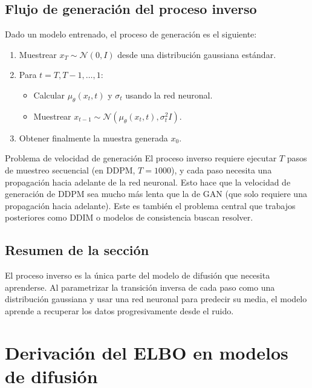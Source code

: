 \documentclass[a4paper]{article}
\begin{document}
\subsection{Flujo de generación del proceso inverso}

Dado un modelo entrenado, el proceso de generación es el siguiente:

\begin{enumerate}
    \item Muestrear $x_T \sim \mathcal{N}(0, I)$ desde una distribución gaussiana estándar.
    \item Para $t = T, T-1, \ldots, 1$:
    \begin{itemize}
        \item Calcular $\mu_\theta(x_t, t)$ y $\sigma_t$ usando la red neuronal.
        \item Muestrear $x_{t-1} \sim \mathcal{N}(\mu_\theta(x_t, t), \sigma_t^2 I)$.
    \end{itemize}
    \item Obtener finalmente la muestra generada $x_0$.
\end{enumerate}

\begin{warningbox}{Problema de velocidad de generación}
El proceso inverso requiere ejecutar $T$ pasos de muestreo secuencial (en DDPM, $T = 1000$), y cada paso necesita una propagación hacia adelante de la red neuronal. Esto hace que la velocidad de generación de DDPM sea mucho más lenta que la de GAN (que solo requiere una propagación hacia adelante). Este es también el problema central que trabajos posteriores como DDIM o modelos de consistencia buscan resolver.
\end{warningbox}

\subsection{Resumen de la sección}

El proceso inverso es la única parte del modelo de difusión que necesita aprenderse. Al parametrizar la transición inversa de cada paso como una distribución gaussiana y usar una red neuronal para predecir su media, el modelo aprende a recuperar los datos progresivamente desde el ruido.


\section{Derivación del ELBO en modelos de difusión}
\end{document}
